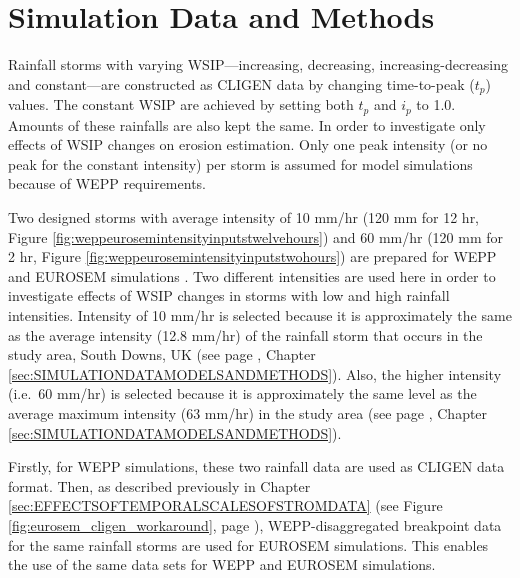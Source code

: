 \section{Simulation Data and Methods}
\label{sec:IntensiyPatternsMethods}

Rainfall storms with varying WSIP---increasing, decreasing,
increasing-decreasing and constant---are constructed as CLIGEN data by changing
time-to-peak ($t_p$) values. The constant WSIP are achieved by setting both
$t_p$ and $i_p$ to 1.0. Amounts of these rainfalls are also kept the same. In
order to investigate only effects of WSIP changes on erosion estimation. Only
one peak intensity (or no peak for the constant intensity) per storm is assumed
for model simulations because of WEPP requirements.

Two designed storms with average intensity of 10 mm/hr (120 mm for 12 hr, Figure
\ref{fig:weppeurosemintensityinputstwelvehours})
and 60 mm/hr (120 mm for 2 hr, Figure
\ref{fig:weppeurosemintensityinputstwohours}) are prepared for WEPP and EUROSEM
simulations . Two different intensities are used here in order to investigate
effects of WSIP changes in storms with low and high rainfall intensities.
Intensity of 10 mm/hr is selected because it is approximately
the same as the average intensity (12.8 mm/hr) of the rainfall storm that occurs
in the study area, South Downs, UK (see page \pageref{sec:EventRainfallData},
Chapter \ref{sec:SIMULATIONDATAMODELSANDMETHODS}). Also, the higher intensity
(i.e.\ 60 mm/hr) is selected because it is approximately the same level as the
average maximum intensity (63 mm/hr) in the study area (see page
\pageref{sec:EventRainfallData}, Chapter
\ref{sec:SIMULATIONDATAMODELSANDMETHODS}).

Firstly, for WEPP simulations, these two rainfall data are used as CLIGEN data
format. Then, as described previously in Chapter
\ref{sec:EFFECTSOFTEMPORALSCALESOFSTROMDATA} (see Figure
\ref{fig:eurosem_cligen_workaround}, page
\pageref{fig:eurosem_cligen_workaround}), WEPP-disaggregated breakpoint data for
the same rainfall storms are used for EUROSEM simulations. This enables the use
of the same data sets for WEPP and EUROSEM simulations.

